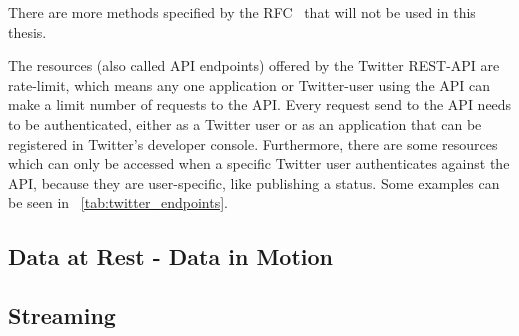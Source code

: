 There are more methods specified by the RFC~\cite{RFC2616} that will not be used in this thesis.
\par
The resources (also called API endpoints) offered by the Twitter REST-API are rate-limit,
which means any one application or Twitter-user using the API can make a limit number of requests to the API.
Every request send to the API needs to be authenticated,
either as a Twitter user or as an application that can be registered in Twitter's developer console.
Furthermore, there are some resources which can only be accessed when a specific Twitter user authenticates
against the API, because they are user-specific, like publishing a status.
Some examples can be seen in ~\ref{tab:twitter_endpoints}.

\begin{table}
    \caption{A selection of resources offered by the Twitter REST API~\cite{twitterDocs}}
    \label{tab:twitter_endpoints}
\end{table}

\subsection{Data at Rest - Data in Motion}
\label{subsec:dataAtRest-DataInMotion}


\subsection{Streaming}
\label{subsec:streaming}

